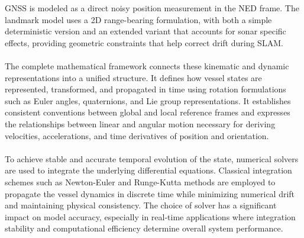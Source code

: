 GNSS is modeled as a direct noisy position measurement in the NED frame. The landmark model uses a 2D range-bearing formulation, with both a simple deterministic version and an extended variant that accounts for sonar specific effects, providing geometric constraints that help correct drift during SLAM.
\\ \\
The complete mathematical framework connects these kinematic and dynamic representations into a unified structure. It defines how vessel states are represented, transformed, and propagated in time using rotation formulations such as Euler angles, quaternions, and Lie group representations. It establishes consistent conventions between global and local reference frames and expresses the relationships between linear and angular motion necessary for deriving velocities, accelerations, and time derivatives of position and orientation.  
\\ \\
To achieve stable and accurate temporal evolution of the state, numerical solvers are used to integrate the underlying differential equations. Classical integration schemes such as Newton-Euler and Runge-Kutta methods are employed to propagate the vessel dynamics in discrete time while minimizing numerical drift and maintaining physical consistency. The choice of solver has a significant impact on model accuracy, especially in real-time applications where integration stability and computational efficiency determine overall system performance.  
